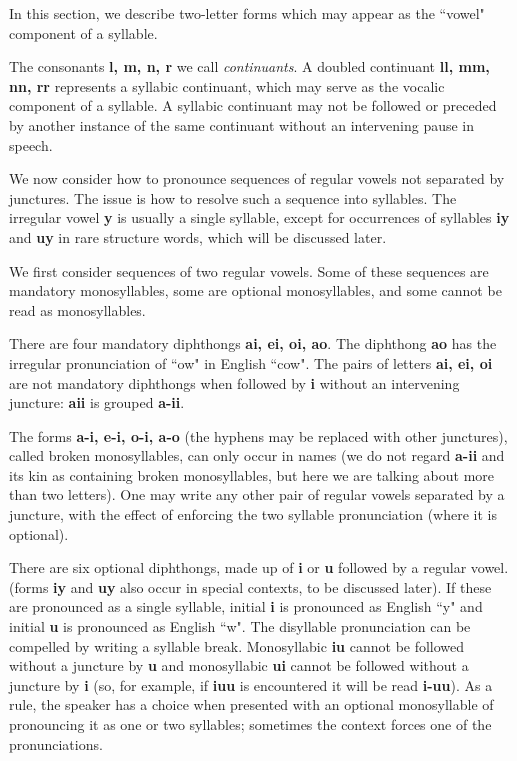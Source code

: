 \documentclass[12pt]{book}
\begin{document}
In this section, we describe two-letter forms which may appear as the ``vowel" component of a syllable.

The consonants {\bf l, m, n, r} we call {\em continuants}.  A doubled continuant {\bf ll, mm, nn, rr} represents a syllabic continuant, which may serve as the vocalic component of a syllable.
A syllabic continuant may not be followed  or preceded by another instance of the same continuant without an intervening pause in speech.

We now consider how to pronounce sequences of regular vowels not separated by junctures.  The issue is how to resolve such a sequence into syllables.
The irregular vowel {\bf y} is usually a single syllable, except for occurrences of syllables {\bf iy} and {\bf uy} in rare structure words, which will be discussed later.

We first consider sequences of two regular vowels.  Some of these sequences are mandatory monosyllables, some are optional monosyllables, and some cannot be read as monosyllables.

There are four mandatory diphthongs {\bf ai, ei, oi, ao}.  The diphthong {\bf ao} has the irregular pronunciation of ``ow"  in English ``cow".   The pairs of letters {\bf ai, ei, oi} are not mandatory diphthongs when followed by {\bf i} without an intervening juncture:  {\bf aii} is grouped {\bf a-ii}.

The forms {\bf a-i, e-i, o-i, a-o} (the hyphens may be replaced with other junctures), called broken monosyllables, can only occur in names (we do not regard {\bf a-ii} and its kin as containing broken monosyllables, but here we are talking about more than two letters).  One may write any other pair of regular vowels separated by a juncture, with the effect of enforcing the two syllable pronunciation (where it is optional).

There are six optional diphthongs, made up of {\bf i} or {\bf u} followed by a regular vowel.  (forms {\bf iy} and {\bf uy} also occur in special contexts, to be discussed later).  If these are pronounced as a single syllable, initial {\bf i} is pronounced as English ``y" and initial {\bf u} is pronounced as English ``w".  The disyllable pronunciation can be compelled by writing
a syllable break.   Monosyllabic {\bf iu} cannot be followed without a juncture by {\bf u} and monosyllabic {\bf ui} cannot be followed without a juncture by {\bf i} (so, for example, if
{\bf iuu} is encountered it will be read {\bf i-uu}).  As a rule, the speaker has a choice when presented with an optional monosyllable of pronouncing it as one or two syllables; sometimes the context forces one of the pronunciations.
\end{document}
